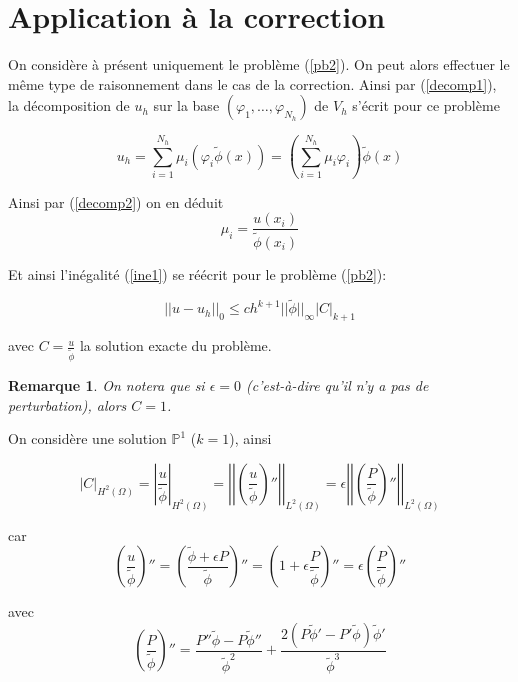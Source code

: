 \documentclass[french]{article}
\newtheorem*{Rem}{Remarque}
\begin{document}
	\section*{Application à la correction}
	
	On considère à présent uniquement le problème (\ref{pb2}). On peut alors effectuer le même type de raisonnement dans le cas de la correction. Ainsi par (\ref{decomp1}), la décomposition de $u_h$ sur la base $(\varphi_1,\dots,\varphi_{N_h})$ de $V_h$ s'écrit pour ce problème
	
	\begin{equation}
		u_h=\sum_{i=1}^{N_h}\mu_i(\varphi_i\tilde{\phi}(x))=\left(\sum_{i=1}^{N_h}\mu_i\varphi_i\right)\tilde{\phi}(x) \label{decomp2}
	\end{equation}
		
	Ainsi par (\ref{decomp2}) on en déduit
	$$\mu_i=\frac{u(x_i)}{\tilde{\phi}(x_i)}$$

	Et ainsi l'inégalité (\ref{ine1}) se réécrit pour le problème (\ref{pb2}):
	
	\begin{equation}
		\left|\left|u-u_h\right|\right|_0\le ch^{k+1}||\tilde{\phi}||_\infty\left|C\right|_{k+1}
		\label{ine2}
	\end{equation}

	avec $C=\frac{u}{\tilde{\phi}}$ la solution exacte du problème.
	
	\begin{Rem}
		On notera que si $\epsilon=0$ (c'est-à-dire qu'il n'y a pas de perturbation), alors $C=1$.
	\end{Rem}
	
	On considère une solution $\mathbb{P}^1$ ($k=1$), ainsi
	
	\begin{equation}
		|C|_{H^2(\Omega)}=\left|\frac{u}{\tilde{\phi}}\right|_{H^2(\Omega)}=\left|\left|\left(\frac{u}{\tilde{\phi}}\right)''\right|\right|_{L^2(\Omega)}=\epsilon\left|\left|\left(\frac{P}{\tilde{\phi}}\right)''\right|\right|_{L^2(\Omega)} \label{der1}
	\end{equation}
	
	car
	$$\left(\frac{u}{\tilde{\phi}}\right)''=\left(\frac{\tilde{\phi}+\epsilon P}{\tilde{\phi}}\right)''=\left(1+\epsilon\frac{P}{\tilde{\phi}}\right)''=\epsilon\left(\frac{P}{\tilde{\phi}}\right)''$$
	
	avec
	$$\left(\frac{P}{\tilde{\phi}}\right)''=\frac{P''\tilde{\phi}-P\tilde{\phi}''}{\tilde{\phi}^2}+\frac{2(P\tilde{\phi}'-P'\tilde{\phi})\tilde{\phi}'}{\tilde{\phi}^3}$$
\end{document}
